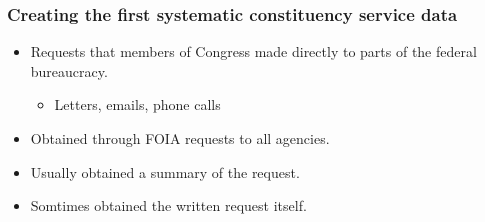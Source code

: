 \documentclass[13pt]{beamer}
\begin{document}
\begin{frame}
\frametitle{Creating the first systematic constituency service data}
\Large
\begin{itemize}
\item Requests that members of Congress made directly to parts of the federal bureaucracy.
\begin{itemize}
\item Letters, emails, phone calls
\end{itemize}
\item Obtained through FOIA requests to all agencies.
\item Usually obtained a summary of the request.
\item Somtimes obtained the written request itself.
\end{itemize}
\end{frame}
\end{document}
